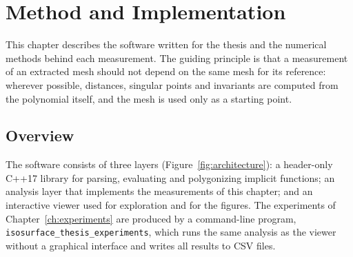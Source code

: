\chapter{Method and Implementation}
\label{ch:method}

This chapter describes the software written for the thesis and the numerical
methods behind each measurement. The guiding principle is that a measurement
of an extracted mesh should not depend on the same mesh for its reference:
wherever possible, distances, singular points and invariants are computed
from the polynomial itself, and the mesh is used only as a starting point.

\section{Overview}
\label{sec:method-overview}

The software consists of three layers (Figure~\ref{fig:architecture}): a
header-only C++17 library for parsing, evaluating and polygonizing implicit
functions; an analysis layer that implements the measurements of this
chapter; and an interactive viewer used for exploration and for the figures.
The experiments of Chapter~\ref{ch:experiments} are produced by a command-line
program, \texttt{isosurface\_thesis\_experiments}, which runs the same
analysis as the viewer without a graphical interface and writes all results
to CSV files.

